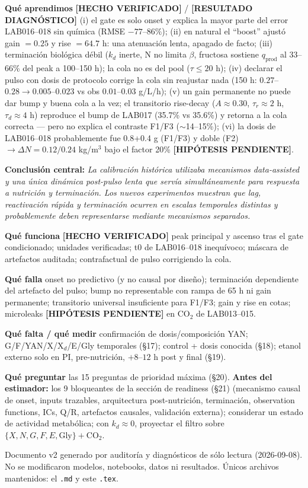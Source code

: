 \documentclass[11pt,a4paper]{article}
\newcommand{\hecho}{\textcolor{hecho}{\textbf{[HECHO VERIFICADO]}}}
\newcommand{\diag}{\textcolor{diagc}{\textbf{[RESULTADO DIAGN\'OSTICO]}}}
\newcommand{\hipo}{\textcolor{hipo}{\textbf{[HIP\'OTESIS PENDIENTE]}}}
\newcommand{\ruta}[1]{\texttt{\small #1}}
\begin{document}
\textbf{Qu\'e aprendimos} \hecho{} / \diag{} (i) el gate es solo onset y explica la mayor parte del error LAB016--018 sin qu\'imica (RMSE $-77$--$86\%$); (ii) en natural el ``boost'' ajust\'o gain $=0.25$ y rise $=64.7$ h: una atenuaci\'on lenta, apagado de facto; (iii) terminaci\'on biol\'ogica d\'ebil ($k_d$ inerte, N no limita $\beta$, fructosa sostiene $q_{\mathrm{prod}}$ al 33--66\% del peak a 100--150 h); la cola no es del pool ($\tau\le 20$ h); (iv) declarar el pulso con dosis de protocolo corrige la cola sin reajustar nada (150 h: $0.27$--$0.28 \to 0.005$--$0.023$ vs obs $0.01$--$0.03$ g/L/h); (v) un gain permanente no puede dar bump y buena cola a la vez; el transitorio rise-decay ($A{\approx}0.30$, $\tau_r{\approx}2$ h, $\tau_d{\approx}4$ h) reproduce el bump de LAB017 (35.7\% vs 35.6\%) y retorna a la cola correcta --- pero no explica el contraste F1/F3 (${\sim}$14--15\%); (vi) la dosis de LAB016--018 probablemente fue 0.8+0.4 g (F1/F3) y doble (F2) $\to \Delta N = 0.12/0.24$ kg/m$^3$ bajo el factor 20\% \hipo{}.

\textbf{Conclusi\'on central:} \emph{La calibraci\'on hist\'orica utilizaba mecanismos data-assisted y una \'unica din\'amica post-pulso lenta que serv\'ia simult\'aneamente para respuesta a nutrici\'on y terminaci\'on. Los nuevos experimentos muestran que lag, reactivaci\'on r\'apida y terminaci\'on ocurren en escalas temporales distintas y probablemente deben representarse mediante mecanismos separados.}

\textbf{Qu\'e funciona} \hecho{} peak principal y ascenso tras el gate condicionado; unidades verificadas; t0 de LAB016--018 inequ\'ivoco; m\'ascara de artefactos auditada; contrafactual de pulso corrigiendo la cola.

\textbf{Qu\'e falla} onset no predictivo (y no causal por dise\~no); terminaci\'on dependiente del artefacto del pulso; bump no representable con rampa de 65 h ni gain permanente; transitorio universal insuficiente para F1/F3; gain y rise en cotas; microleaks \hipo{} en CO$_2$ de LAB013--015.

\textbf{Qu\'e falta / qu\'e medir} confirmaci\'on de dosis/composici\'on YAN; G/F/YAN/X/X$_d$/E/Gly temporales (\S17); control + dosis conocida (\S18); etanol externo solo en PI, pre-nutrici\'on, $+8$--$12$ h post y final (\S19).

\textbf{Qu\'e preguntar} las 15 preguntas de prioridad m\'axima (\S20). \textbf{Antes del estimador:} los 9 bloqueantes de la secci\'on de readiness (\S21) (mecanismo causal de onset, inputs trazables, arquitectura post-nutrici\'on, terminaci\'on, observation functions, ICs, Q/R, artefactos causales, validaci\'on externa); considerar un estado de actividad metab\'olica; con $k_d\approx 0$, proyectar el filtro sobre $\{X, N, G, F, E, \mathrm{Gly}\} + \mathrm{CO}_2$.

\vspace{0.5em}
\footnotesize Documento v2 generado por auditor\'ia y diagn\'osticos de s\'olo lectura (2026-09-08). No se modificaron modelos, notebooks, datos ni resultados. \'Unicos archivos mantenidos: el \ruta{.md} y este \ruta{.tex}.
\end{document}
